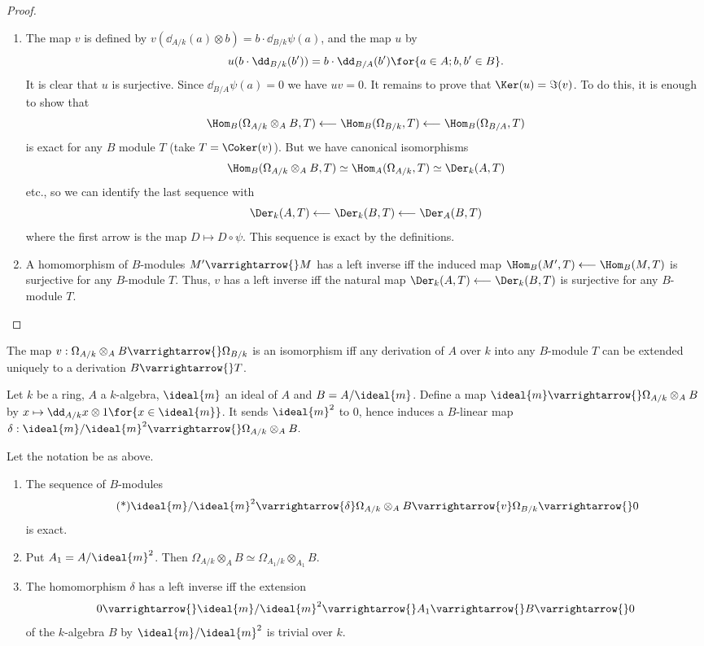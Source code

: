 \documentclass[../main]{subfiles}
\begin{document}
\begin{proof}
\begin{enumerate}
    \item The map $v$ is defined by $v(\dd_{A / k}(a) \otimes b)=b \cdot \dd_{B / k} \psi(a)$, and the map $u$ by \[u(b \cdot \dd_{B / k}(b'))=b \cdot \dd_{B / A}(b')\for{a \in A ; b, b' \in B}.\] It is clear that $u$ is surjective. Since $\dd_{B / A} \psi(a)=0$ we have $u v=0$. It remains to prove that $\Ker(u)=\Im(v)$. To do this, it is enough to show that \[\Hom_B(\Omega_{A/k} \otimes_A B, T)\longleftarrow\Hom_B(\Omega_{B/ k}, T)\longleftarrow\Hom_B(\Omega_{B / A}, T)\]
    is exact for any $B$ module $T$ (take $T=\Coker(v)$). But we have canonical isomorphisms \[\Hom_B(\Omega_{A/k}\otimes_A B, T) \simeq \Hom_A(\Omega_{A/k}, T) \simeq\Der_k(A, T)\] etc., so we can identify the last sequence with \[\Der_k(A, T)\longleftarrow\Der_k(B, T)\longleftarrow\Der_A(B, T)\] where the first arrow is the map $D \mapsto D \circ \psi$. This sequence is exact by the definitions.
    
    \item A homomorphism of $B$-modules $M' \varrightarrow{} M$ has a left inverse iff the induced map $\Hom_B(M', T)\longleftarrow\Hom_B(M, T)$ is surjective for any $B$-module $T$. Thus, $v$ has a left inverse iff the natural map $\Der_k(A, T)\longleftarrow\Der_k(B, T)$ is surjective for any $B$-module $T$.
\end{enumerate}
\end{proof}

\begin{corollary}\label{cor:26.01}
The map $v: \Omega_{A / k} \otimes_A B \varrightarrow{} \Omega_{B / k}$ is an isomorphism iff any derivation of $A$ over $k$ into any $B$-module $T$ can be extended uniquely to a derivation $B \varrightarrow{} T$.
\end{corollary}
 
\newparagraph Let $k$ be a ring, $A$ a $k$-algebra, $\ideal{m}$ an ideal of $A$ and $B=A / \ideal{m}$. Define a map $\ideal{m} \varrightarrow{} \Omega_{A/k} \otimes_A B$ by $x \mapsto \dd_{A / k} x \otimes 1\for{x \in \ideal{m}}$. It sends $\ideal{m}^2$ to $0$, hence induces a $B$-linear map $\delta: \ideal{m}/\ideal{m}^2 \varrightarrow{} \Omega_{A/k}\otimes_A B.$

\begin{theorem}\label{thm:058}
Let the notation be as above.
\begin{enumerate}
    \item The sequence of $B$-modules \[\tag{*}\label{eqn:26.*} \ideal{m}/\ideal{m}^2 \varrightarrow{\delta}\Omega_{A/k}\otimes_AB \varrightarrow{v}\Omega_{B/k} \varrightarrow{}0\] is exact.
    \item Put $A_1 =A/\ideal{m}^2$. Then $\Omega_{A/k} \otimes_A B \simeq \Omega_{A_1/k}\otimes_{A_1}B.$
    \item The homomorphism $\delta$ has a left inverse iff the extension
\[0 \varrightarrow{} \ideal{m} / \ideal{m}^2\varrightarrow{}A_1 \varrightarrow{} B \varrightarrow{} 0\] of the $k$-algebra $B$ by $\ideal{m}/\ideal{m}^2$ is trivial over $k$.
\end{enumerate}
\end{theorem}
\end{document}
